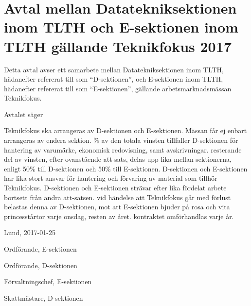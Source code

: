 \documentclass[10pt]{article}
\def\tfdate{2017}
\def\doctitle{Avtal mellan Datatekniksektionen inom TLTH och E-sektionen inom TLTH gällande Teknikfokus {\tfdate}}
\def\date{2017-01-25} %
\begin{document}
    \section*{\doctitle}
    Detta avtal avser ett samarbete mellan Datatekniksektionen inom TLTH, hädanefter refererat till som ``D-sektionen'', och E-sektionen inom TLTH, hädanefter refererat till som ``E-sektionen'', gällande arbetsmarknadsmässan Teknikfokus.

    Avtalet säger
    \begin{attsatser}
        \att Teknikfokus ska arrangeras av D-sektionen och E-sektionen. Mässan får ej enbart arrangeras av endera sektion.
        \% av den totala vinsten tillfaller D-sektionen för hantering av varumärke, ekonomisk redovisning, samt avskrivningar.
        \att resterande del av vinsten, efter ovanstående att-sats, delas upp lika mellan sektionerna, enligt 50\% till D-sektionen och 50\% till E-sektionen.
        \att D-sektionen och E-sektionen har lika stort ansvar för hantering och förvaring av material som tillhör Teknikfokus.
        \att D-sektionen och E-sektionen strävar efter lika fördelat arbete bortsett från andra att-satsen.
        \att vid händelse att Teknikfokus går med förlust belastas denna av D-sektionen, mot att E-sektionen bjuder på rosa och vita princesstårtor varje onsdag, resten av året.
        \att kontraktet omförhandlas varje år.
    \end{attsatser}

    \begin{signatures}{4}
        Lund, \date
        \signature{Erik Månsson}{Ordförande, E-sektionen}
		\signature{Axel Isberg}{Ordförande, D-sektionen}
		\signature{Sophia Grimmeiss Grahm}{Förvaltningschef, E-sektionen}
        \signature{Axel Wihlborg}{Skattmästare, D-sektionen}
    \end{signatures}
\end{document}
